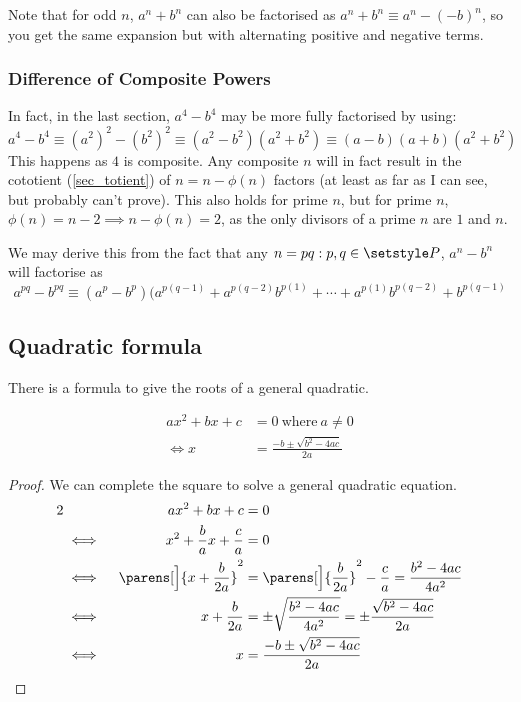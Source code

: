 Note that for odd \(n\), \(a^n + b^n\) can also be factorised as
\(a^n + b^n \equiv a^n - (-b)^n\), so you get the same expansion but with
alternating positive and negative terms.


\subsubsection{Difference of Composite Powers}

In fact, in the last section, \(a^4 - b^4\) may be more fully factorised by
using:
\begin{equation*}
    a^4 - b^4 \equiv (a^2)^2 - (b^2)^2 \equiv (a^2 - b^2)(a^2 + b^2) \equiv
        (a - b)(a + b)(a^2 + b^2)
\end{equation*}
This happens as \(4\) is composite. Any composite \(n\) will in fact result
in the cototient (\ref{sec_totient}) of \(n = n - \phi(n)\) factors (at
least as far as I can see, but probably can't prove). This
also holds for prime \(n\), but for prime \(n\),
\(\phi(n) = n - 2 \implies n - \phi(n) = 2\), as the only divisors of
a prime \(n\) are \(1\) and \(n\).

We may derive this from the fact that any \(n = pq: p, q \in \setstyle P\),
\(a^n - b^n\) will factorise as
\begin{equation}
    a^{pq} - b^{pq} \equiv
        (a^p - b^p)(a^{p(q - 1)} + a^{p(q - 2)}b^{p(1)} + \dotsb +
                    a^{p(1)}b^{p(q - 2)} + b^{p(q - 1)}
\end{equation}

\subsection{Quadratic formula} \label{sec_quad_formula}

There is a formula to give the roots of a general quadratic.
\begin{theorem}
\begin{align*}
ax^2 + bx + c &= 0\ \text{where}\ a \neq 0 \\
\iff x &= \frac{-b \pm \sqrt{b^2 - 4ac}}{2a}
\end{align*}
\end{theorem}
\begin{proof}
We can complete the square to solve a general quadratic equation.
\begin{alignat*}2
&&ax^2 + bx + c &= 0 \\
    &\iff{}& x^2 + \frac ba x + \frac ca &= 0 \\
    &\iff{}& \parens[\Big]{x + \frac b{2a}}^2
        &= \parens[\Big]{\frac b{2a}}^2 - \frac ca
        = \frac{b^2 - 4ac}{4a^2} \\
    &\iff{}& x + \frac b{2a} &= \pm \sqrt{\frac{b^2 - 4ac}{4a^2}}
        = \pm \frac{\sqrt{b^2 - 4ac}}{2a} \\
    &\iff{}& x &= \frac{-b \pm \sqrt{b^2 - 4ac}}{2a} \qedhere
\end{alignat*}
\end{proof}

